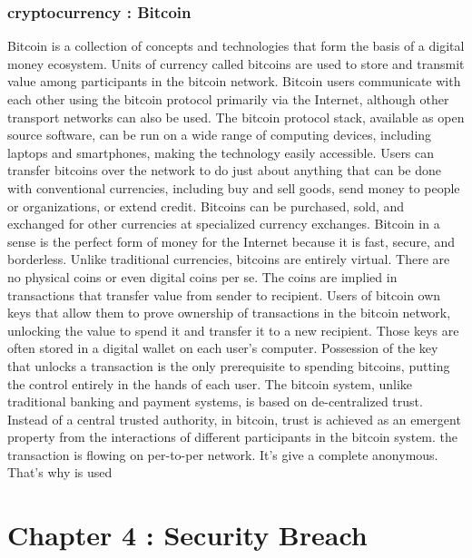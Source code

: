 \documentclass[twosided,a4,10pt]{article}
\begin{document}
\begin{multicols}{2}
\subsubsection{cryptocurrency : Bitcoin}

Bitcoin is a collection of concepts and technologies that form the basis of a digital money ecosystem. Units of currency called bitcoins are used to store and transmit value among participants in the bitcoin network. Bitcoin users communicate with each other using the bitcoin protocol primarily via the Internet, although other transport networks can also be used. The bitcoin protocol stack, available as open source software, can be run on a wide range of computing devices, including laptops and smartphones, making the technology easily accessible. \newline
Users can transfer bitcoins over the network to do just about anything that can be done with conventional currencies, including buy and sell goods, send money to people or organizations, or extend credit. Bitcoins can be purchased, sold, and exchanged for other currencies at specialized currency exchanges. Bitcoin in a sense is the perfect form of money for the Internet because it is fast, secure, and borderless.\newline
\newline
Unlike traditional currencies, bitcoins are entirely virtual. There are no physical coins or even digital coins per se. The coins are implied in transactions that transfer value from sender to recipient. Users of bitcoin own keys that allow them to prove ownership of transactions in the bitcoin network, unlocking the value to spend it and transfer it to a new recipient. Those keys are often stored in a digital wallet on each user’s computer. Possession of the key that unlocks a transaction is the only prerequisite to spending bitcoins, putting the control entirely in the hands of each user.\newline
The bitcoin system, unlike traditional banking and payment systems, is based on de-centralized trust. Instead of a central trusted authority, in bitcoin, trust is achieved as an emergent property from the interactions of different participants in the bitcoin system. the transaction is flowing on per-to-per network. It's give a 
complete anonymous. That's why is used
 
\section{Chapter 4 : Security Breach}


\end{multicols}
\end{document}
